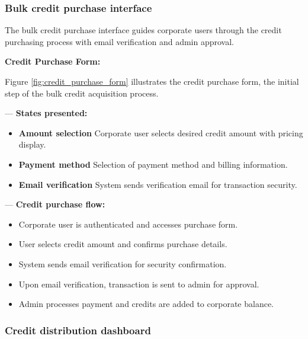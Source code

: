 \subsubsection{Bulk credit purchase interface}

The bulk credit purchase interface guides corporate users through the credit purchasing process with email verification and admin approval.

\noindent\textbf{Credit Purchase Form:}

Figure \ref{fig:credit_purchase_form} illustrates the credit purchase form, the initial step of the bulk credit acquisition process.


— \textbf{States presented:}
\begin{itemize}[nosep,leftmargin=*,label=•]
  \item \textbf{Amount selection}  
    Corporate user selects desired credit amount with pricing display.
  \item \textbf{Payment method}  
    Selection of payment method and billing information.
  \item \textbf{Email verification}  
    System sends verification email for transaction security.
\end{itemize}

— \textbf{Credit purchase flow:}
\begin{itemize}[nosep,leftmargin=*,label=•]
  \item Corporate user is authenticated and accesses purchase form.
  \item User selects credit amount and confirms purchase details.
  \item System sends email verification for security confirmation.
  \item Upon email verification, transaction is sent to admin for approval.
  \item Admin processes payment and credits are added to corporate balance.
\end{itemize}

\subsubsection{Credit distribution dashboard}

